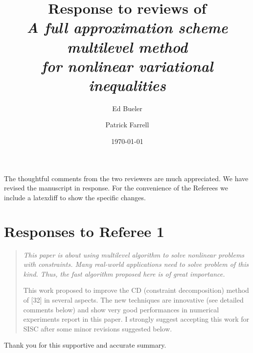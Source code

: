 \documentclass[letterpaper,final,12pt,reqno]{amsart}
\newenvironment{review}%
{\bigskip \par \begin{quote} \selectfont \sl}%
{\end{quote}}
\newcommand\short[1]{\medskip\noindent #1}   %
\begin{document}
\title[Response to reviews]{Response to reviews of \\ \emph{A full approximation scheme multilevel method \\ for nonlinear variational inequalities}}

\author{Ed Bueler}

\author{Patrick Farrell}

\date{\today}

\maketitle


\thispagestyle{empty}

The thoughtful comments from the two reviewers are much appreciated.  We have revised the manuscript in response. For the convenience of the Referees we include a latexdiff to show the specific changes.


\section{Responses to Referee 1}


\begin{review}
This paper is about using multilevel algorithm to solve nonlinear problems with constraints. Many real-world applications need to solve problem of this kind. Thus, the fast algorithm proposed here is of great importance.

This work proposed to improve the CD (constraint decomposition) method of [32] in several aspects. The new techniques are innovative (see detailed comments below) and show very good performances in numerical experiments report in this paper. I strongly suggest accepting this work for SISC after some minor revisions suggested below.
\end{review}

\short{Thank you for this supportive and accurate summary.}
\end{document}
